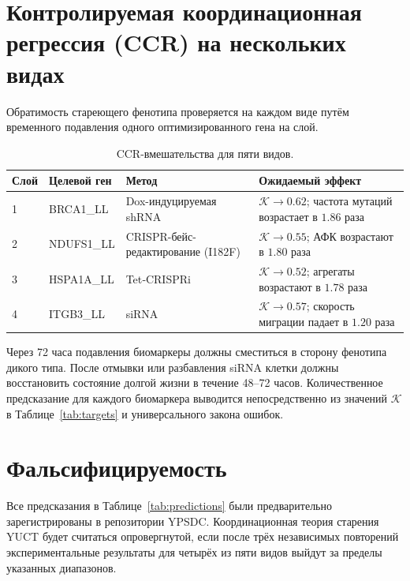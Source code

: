 \documentclass[12pt,a4paper]{article}
\newcommand{\REL}{\mathcal{K}}          %
\begin{document}
	\section{Контролируемая координационная регрессия (CCR) на нескольких видах}
	\label{sec:CCR}
	Обратимость стареющего фенотипа проверяется на каждом виде путём временного подавления одного оптимизированного гена на слой.
	
	\begin{table}[H]
		\centering
		\caption{CCR-вмешательства для пяти видов.}
		\label{tab:CCR}
		\begin{tabular}{@{}llll@{}}
			\toprule
			\textbf{Слой} & \textbf{Целевой ген} & \textbf{Метод} & \textbf{Ожидаемый эффект} \\
			\midrule
			1 & BRCA1\_LL & Dox-индуцируемая shRNA & \(\REL \to 0.62\); частота мутаций возрастает в \(1.86\) раза \\
			2 & NDUFS1\_LL & CRISPR-бейс-редактирование (I182F) & \(\REL \to 0.55\); АФК возрастают в \(1.80\) раза \\
			3 & HSPA1A\_LL & Tet‑CRISPRi & \(\REL \to 0.52\); агрегаты возрастают в \(1.78\) раза \\
			4 & ITGB3\_LL & siRNA & \(\REL \to 0.57\); скорость миграции падает в \(1.20\) раза \\
			\bottomrule
		\end{tabular}
	\end{table}
	
	Через 72 часа подавления биомаркеры должны сместиться в сторону фенотипа дикого типа. После отмывки или разбавления siRNA клетки должны восстановить состояние долгой жизни в течение 48–72 часов. Количественное предсказание для каждого биомаркера выводится непосредственно из значений \(\REL\) в Таблице~\ref{tab:targets} и универсального закона ошибок.
	
	\section{Фальсифицируемость}
	\label{sec:falsifiability}
	Все предсказания в Таблице~\ref{tab:predictions} были предварительно зарегистрированы в репозитории YPSDC. Координационная теория старения YUCT будет считаться опровергнутой, если после трёх независимых повторений экспериментальные результаты для четырёх из пяти видов выйдут за пределы указанных диапазонов.
	
\end{document}
